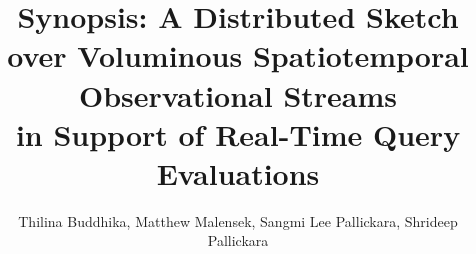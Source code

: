 \documentclass{vldb}
\begin{document}
\title{Synopsis: A Distributed Sketch over Voluminous Spatiotemporal Observational Streams \\ in Support of Real-Time Query Evaluations}

\author{
\alignauthor
Thilina Buddhika, Matthew Malensek, Sangmi Lee Pallickara, Shrideep Pallickara \\
       \\
       \\
       \\
}

\maketitle













\end{document}
